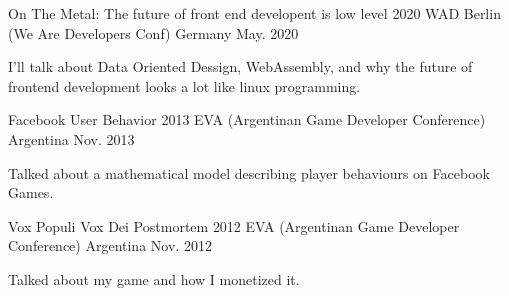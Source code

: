 

\begin{cventries}

\cventry
{On The Metal: The future of front end developent is low level} %
{2020 WAD Berlin (We Are Developers Conf)} %
{Germany} %
{May. 2020} %
{
    \begin{cvitems} %
        \item {I'll talk about Data Oriented Dessign, WebAssembly, and why the future of frontend development looks a lot like linux programming.}
    \end{cvitems}
}

  \cventry
    {Facebook User Behavior} %
    {2013 EVA (Argentinan Game Developer Conference)} %
    {Argentina} %
    {Nov. 2013} %
    {
      \begin{cvitems} %
         \item {Talked about a mathematical model describing player behaviours on Facebook Games.}
      \end{cvitems}
    }

 \cventry
    {Vox Populi Vox Dei Postmortem} %
    {2012 EVA (Argentinan Game Developer Conference)} %
    {Argentina} %
    {Nov. 2012} %
    {
      \begin{cvitems} %
        \item {Talked about my game and how I monetized it.}
      \end{cvitems}
    }

\end{cventries}
